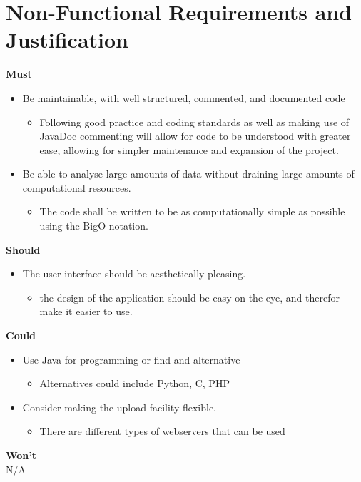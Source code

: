 \section{Non-Functional Requirements and Justification}
\textbf{Must}
\begin{itemize}
    \item Be maintainable, with well structured, commented, and documented code
    \begin{itemize}
        \item Following good practice and coding standards as well as making use of JavaDoc commenting will allow for code to be understood with greater ease, allowing for simpler maintenance and expansion of the project. 
    \end{itemize}
    \item Be able to analyse large amounts of data without draining large amounts of computational resources.
    \begin{itemize}
        \item The code shall be written to be as computationally simple as possible using the BigO notation.
    \end{itemize}
\end{itemize}
\textbf{Should}
\begin{itemize}
    \item The user interface should be aesthetically pleasing. 
    \begin{itemize}
        \item the design of the application should be easy on the eye, and therefor make it easier to use.
    \end{itemize}
\end{itemize}
\textbf{Could}

\begin{itemize}
    \item Use Java for programming or find and alternative 
    \begin{itemize}
        \item Alternatives could include Python, C, PHP 
    \end{itemize}
    \item Consider making the upload facility flexible.
    \begin{itemize}
        \item There are different types of webservers that can be used
    \end{itemize}
\end{itemize}
\textbf{Won't}\\
N/A
